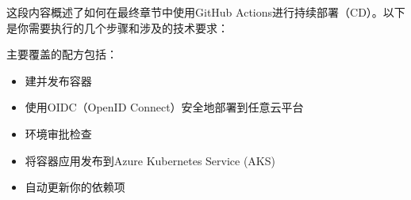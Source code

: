 这段内容概述了如何在最终章节中使用GitHub Actions进行持续部署（CD）。以下是你需要执行的几个步骤和涉及的技术要求：

主要覆盖的配方包括：

\begin{itemize}
\item 
建并发布容器

\item 
使用OIDC（OpenID Connect）安全地部署到任意云平台

\item 
环境审批检查

\item 
将容器应用发布到Azure Kubernetes Service (AKS)

\item 
自动更新你的依赖项
\end{itemize}